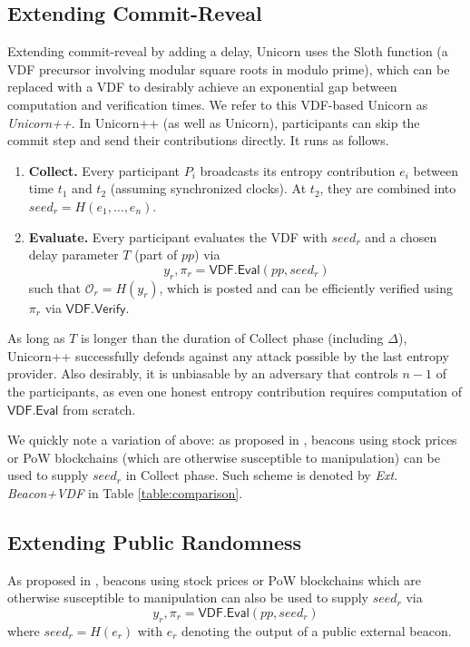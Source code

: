 \documentclass[letterpaper,twocolumn,10pt]{article}
\theoremstyle{definition}
\theoremstyle{remark}
\begin{document}
\subsection{Extending Commit-Reveal}
\label{subsection:extending-commit-reveal}
Extending commit-reveal by adding a delay, Unicorn \cite{lenstra2015random} uses the Sloth function (a VDF precursor involving modular square roots in modulo prime), which can be replaced with a VDF to desirably achieve an exponential gap between computation and verification times. We refer to this VDF-based Unicorn as \textit{Unicorn++}. In Unicorn++ (as well as Unicorn), participants can skip the commit step and send their contributions directly. It runs as follows.
\begin{enumerate}
    \item \textbf{Collect.} Every participant $P_i$ broadcasts its entropy contribution $e_i$ between time $t_1$ and $t_2$ (assuming synchronized clocks). At $t_2$, they are combined into $seed_r = H(e_1,\ldots, e_n)$.
    \item \textbf{Evaluate.} Every participant evaluates the VDF with $seed_r$ and a chosen delay parameter $T$ (part of $pp$) via
    $$y_r, \pi_r = \mathsf{VDF.Eval}(pp, seed_r)$$
    such that $\mathcal{O}_r = H(y_r)$, which is posted and can be efficiently verified using $\pi_r$ via $\mathsf{VDF.Verify}$.
\end{enumerate}

As long as $T$ is longer than the duration of Collect phase (including $\Delta$), Unicorn++ successfully defends against any attack possible by the last entropy provider. Also desirably, it is unbiasable by an adversary that controls $n - 1$ of the participants, as even one honest entropy contribution requires computation of $\mathsf{VDF.Eval}$ from scratch.

We quickly note a variation of above: as proposed in \cite{bunz2017proofs, bonneau2015bitcoin}, beacons using stock prices \cite{clark2010use} or PoW blockchains \cite{nakamoto2008bitcoin, bentov2016bitcoin, han2020randchain} (which are otherwise susceptible to manipulation) can be used to supply $seed_r$ in Collect phase. Such scheme is denoted by \textit{Ext. Beacon+VDF} in Table \ref{table:comparison}.

\iffalse
\subsection{Extending Public Randomness}
As proposed in \cite{bunz2017proofs, bonneau2015bitcoin}, beacons using stock prices \cite{clark2010use} or PoW blockchains \cite{bonneau2015bitcoin} which are otherwise susceptible to manipulation can also be used to supply $seed_r$ via
$$y_r, \pi_r = \mathsf{VDF.Eval}(pp, seed_r)$$
where $seed_r = H(e_r)$ with $e_r$ denoting the output of a public external beacon.
\end{document}
